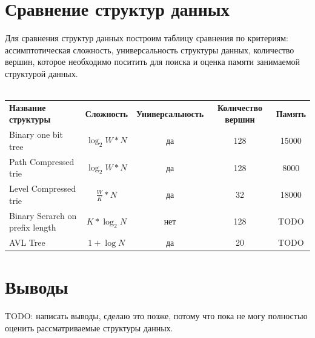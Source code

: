 \documentclass[a4peper, 12pt, titlepage, finall]{extreport}
\begin{document}
        \newpage

    \section{Сравнение структур данных}
        Для сравнения структур данных построим таблицу сравнения по критериям: ассимптотическая сложность, универсальность структуры данных,
        количество вершин, которое необходимо поситить для поиска и оценка памяти занимаемой структурой данных.
        \\
        \\
        \begin{tabular}{lcccc}
            \bf Название структуры & \bf Сложность & \bf Универсальность & \bf Количество вершин & \bf Память \\
            Binary one bit tree & $\log_2{W*N}$ & да & 128 & 15000 \\
            Path Compressed trie & $\log_2{W*N}$ & да & 128 & 8000 \\
            Level Compressed trie & $\frac{W}{K}*N$ & да & 32 & 18000 \\
            Binary Serarch on prefix length & $K*\log_2{N}$ & нет & 128 & {\ttfamily TODO} \\
            AVL Tree & $1 + \log{N}$ & да & 20 & {\ttfamily TODO} \\
        \end{tabular}

    \section {Выводы}
        {\ttfamily TODO: написать выводы, сделаю это позже, потому что пока не могу полностью оценить рассматриваемые структуры данных.}
\end{document}
